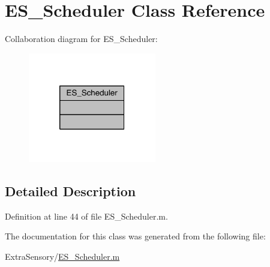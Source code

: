 \hypertarget{class_e_s___scheduler}{\section{E\+S\+\_\+\+Scheduler Class Reference}
\label{class_e_s___scheduler}
}


Collaboration diagram for E\+S\+\_\+\+Scheduler\+:\nopagebreak
\begin{figure}[H]
\begin{center}
\leavevmode
\includegraphics[width=158pt]{dc/d4d/class_e_s___scheduler__coll__graph}
\end{center}
\end{figure}


\subsection{Detailed Description}


Definition at line 44 of file E\+S\+\_\+\+Scheduler.\+m.



The documentation for this class was generated from the following file\+:\begin{DoxyCompactItemize}
\item 
Extra\+Sensory/\hyperlink{_e_s___scheduler_8m}{E\+S\+\_\+\+Scheduler.\+m}\end{DoxyCompactItemize}
